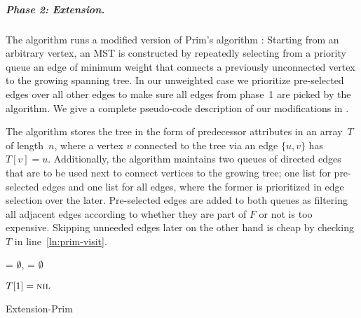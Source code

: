 \documentclass[a4paper, USenglish, cleveref, autoref, thm-restate]{lipics-v2021}
\begin{document}
\subparagraph*{Phase 2: Extension.}
The algorithm runs a modified version of Prim's algorithm \cite{jarnikJistemProblemuMinimalnim1930,primShortestConnectionNetworks1957,dijkstraNoteTwoProblems1959}:
Starting from an arbitrary vertex, an MST is constructed by repeatedly selecting from a priority queue an edge of minimum weight that connects a previously unconnected vertex to the growing spanning tree.
In our unweighted case we prioritize pre-selected edges over all other edges to make sure all edges from phase~1 are picked by the algorithm.
We give a complete pseudo-code description of our modifications in .

The algorithm stores the tree in the form of predecessor attributes in an array~$T$ of length~$n$, where a vertex $v$ connected to the tree via an edge $\{u,v\}$ has $T[v] = u$.
Additionally, the algorithm maintains two queues of directed edges that are to be used next to connect vertices to the growing tree; one list for pre-selected edges and one list for all edges, where the former is prioritized in edge selection over the later.
Pre-selected edges are added to both queues as filtering all adjacent edges according to whether they are part of $F$ or not is too expensive.
Skipping unneeded edges later on the other hand is cheap by checking $T$ in line~\ref{ln:prim-visit}.

\begin{algorithm2e}

	\KwPreSelected = $\emptyset$, \KwAllEdges = $\emptyset$\;



	$T[1] = \textsc{nil}$

	\;

	\caption{Extension-Prim}
	\label{alg:extension-prim}
\end{algorithm2e}
\end{document}
